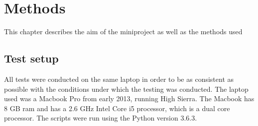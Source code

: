 \chapter{Methods}
This chapter describes the aim of the miniproject as well as the methods used 

\section{} 






\section{Test setup}
All tests were conducted on the same laptop in order to be as consistent as possible with the conditions under which the testing was conducted. The laptop used was a Macbook Pro from early 2013, running High Sierra. The Macbook has 8 GB ram and has a 2.6 GHz Intel Core i5 processor, which is a dual core processor. The scripts were run using the Python version 3.6.3. 